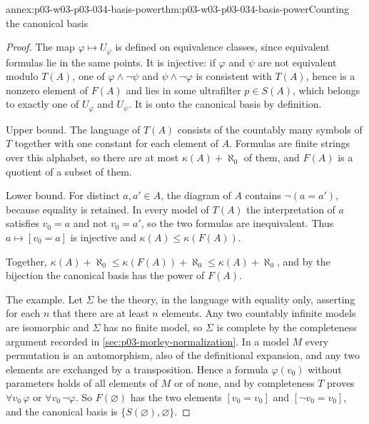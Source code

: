 \begin{annexitem}{annex:p03-w03-p03-034-basis-power}{thm:p03-w03-p03-034-basis-power}{Counting the canonical basis}
\begin{proof}
The map \(\varphi\mapsto U_\varphi\) is defined on equivalence classes,
since equivalent formulas lie in the same points. It is injective: if
\(\varphi\) and \(\psi\) are not equivalent modulo \(T(A)\), one of
\(\varphi\wedge\neg\psi\) and \(\psi\wedge\neg\varphi\) is consistent with
\(T(A)\), hence is a nonzero element of \(F(A)\) and lies in some
ultrafilter \(p\in S(A)\), which belongs to exactly one of \(U_\varphi\)
and \(U_\psi\). It is onto the canonical basis by definition.

Upper bound. The language of \(T(A)\) consists of the countably many
symbols of \(T\) together with one constant for each element of \(A\).
Formulas are finite strings over this alphabet, so there are at most
\(\kappa(A)+\aleph_0\) of them, and \(F(A)\) is a quotient of a subset of
them.

Lower bound. For distinct \(a,a'\in A\), the diagram of \(A\) contains
\(\neg(a=a')\), because equality is retained. In every model of \(T(A)\)
the interpretation of \(a\) satisfies \(v_0=a\) and not \(v_0=a'\), so the
two formulas are inequivalent. Thus \(a\mapsto[v_0=a]\) is injective and
\(\kappa(A)\leq\kappa(F(A))\).

Together, \(\kappa(A)+\aleph_0\leq\kappa(F(A))+\aleph_0\leq
\kappa(A)+\aleph_0\), and by the bijection the canonical basis has the
power of \(F(A)\).

The example. Let \(\Sigma\) be the theory, in the language with equality
only, asserting for each \(n\) that there are at least \(n\) elements. Any
two countably infinite models are isomorphic and \(\Sigma\) has no finite
model, so \(\Sigma\) is complete by the completeness argument recorded in
\cref{sec:p03-morley-normalization}. In a model \(M\) every permutation is
an automorphism, also of the definitional expansion, and any two elements
are exchanged by a transposition. Hence a formula \(\varphi(v_0)\) without
parameters holds of all elements of \(M\) or of none, and by completeness
\(T\) proves \(\forall v_0\,\varphi\) or \(\forall v_0\,\neg\varphi\).
So \(F(\varnothing)\) has the two elements \([v_0=v_0]\) and
\([\neg v_0=v_0]\), and the canonical basis is
\(\{S(\varnothing),\varnothing\}\).
\end{proof}
\end{annexitem}

